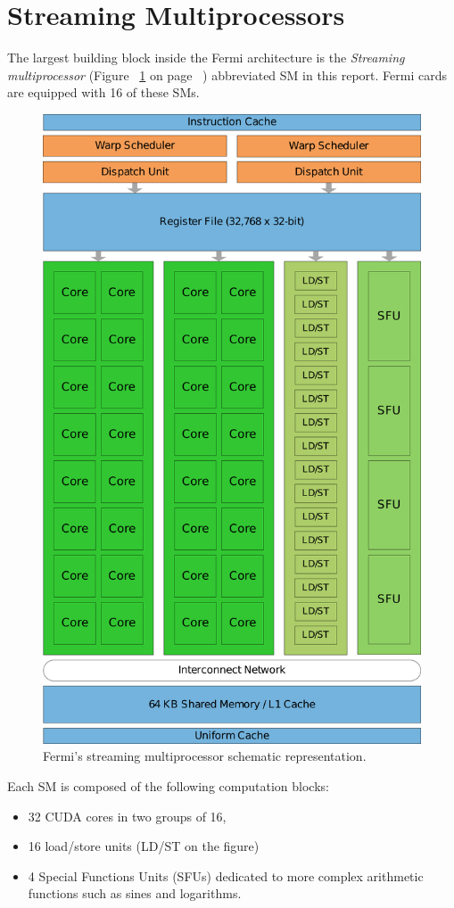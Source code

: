 \documentclass{report}
\begin{document}
    \section{Streaming Multiprocessors}
    The largest building block inside the Fermi architecture is the 
    \emph{Streaming multiprocessor} (Figure ~\ref{fig:SM} on page 
    ~\pageref{fig:SM}) abbreviated SM in this report. Fermi cards are equipped
    with 16 of these SMs.
    \begin{figure}[H]
    \centering
        \includegraphics[width=0.75\linewidth]{pictures/Fermi}
        \captionsetup{justification=centering}
        \caption{Fermi's streaming multiprocessor schematic representation.}
        \label{fig:SM}
    \end{figure}

    Each SM is composed of the following computation blocks:
    \begin{itemize}
        \item 32 CUDA cores in two groups of 16,
        \item 16 load/store units (LD/ST on the figure)
        \item 4 Special Functions Units (SFUs) dedicated to more complex
              arithmetic functions such as sines and logarithms.
    \end{itemize}
    
\end{document}
